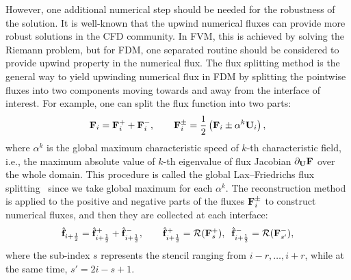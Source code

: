 However, one additional numerical step should be needed for the robustness of the solution.
It is well-known that the upwind numerical fluxes can provide more robust solutions in the CFD community.
In FVM, this is achieved by solving the Riemann problem, but for FDM,
one separated routine should be considered to provide upwind property in the numerical flux.
The flux splitting method is the general way to yield upwinding numerical flux in FDM
by splitting the pointwise fluxes into two components moving towards and away from the interface of interest.
For example, one can split the flux function into two parts:
\begin{equation}\label{eq:lf_splitting}
    \mathbf{F}_{i} = \mathbf{F}^{+}_{i} + \mathbf{F}^{-}_{i}, \qquad \mathbf{F}^{\pm}_{i} = \frac{1}{2} \left( \mathbf{F}_{i} \pm \mathbf{\alpha}^{k} \mathbf{U}_{i} \right),
\end{equation}
where \( \alpha^{k} \) is the global maximum characteristic speed of \( k \)-th characteristic field,
i.e., the maximum absolute value of \( k \)-th eigenvalue of flux Jacobian \( \partial_{\mathbf{U}} \mathbf{F} \) over the whole domain.
This procedure is called the global Lax–Friedrichs flux splitting~\cite{jiang1996efficient}
since we take global maximum for each \( \alpha^{k} \).
The reconstruction method is applied to the positive and negative parts of the fluxes \( \mathbf{F}^{\pm}_{i} \)
to construct numerical fluxes, and then they are collected at each interface:
\begin{equation}\label{eq:lf_splitting_combine}
    \hat{\mathbf{f}}_{{i+\frac{1}{2}}} = \hat{\mathbf{f}}^{+}_{{i+\frac{1}{2}}} + \hat{\mathbf{f}}^{-}_{{i+\frac{1}{2}}},
        \qquad \hat{\mathbf{f}}^{+}_{{i+\frac{1}{2}}} = \mathcal{R}(\mathbf{F}^{+}_{s}),
        \;\; \hat{\mathbf{f}}^{-}_{{i+\frac{1}{2}}} = \mathcal{R}(\mathbf{F}^{-}_{s'}),
\end{equation}
where the sub-index \( s \) represents the stencil ranging from
\( i-r, \dots, i+r \), while at the same time,
\( s' = 2i-s+1 \).

